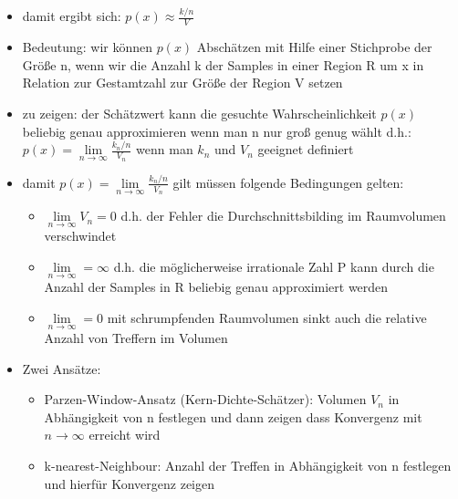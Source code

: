 \documentclass{article} %
\begin{document}
\begin{itemize}
		\item damit ergibt sich: $p(x) \approx \frac{k/n}{V}$
		\item Bedeutung: wir können $p(x)$ Abschätzen mit Hilfe einer Stichprobe der Größe n, wenn wir die Anzahl k der Samples in einer Region R um x in Relation zur Gestamtzahl zur Größe der Region V setzen
		\item zu zeigen: der Schätzwert kann die gesuchte Wahrscheinlichkeit $p(x)$ beliebig genau approximieren wenn man n nur groß genug wählt d.h.: $p(x) = \lim\limits_{n \rightarrow \infty} \frac{k_n/n}{V_n}$ wenn man $k_n$ und $V_n$ geeignet definiert
		\item damit $p(x) = \lim\limits_{n \rightarrow \infty} \frac{k_n/n}{V_n}$ gilt müssen folgende Bedingungen gelten:
		\begin{itemize}
			\item $\lim\limits_{n\rightarrow \infty} V_n  = 0$ d.h. der Fehler die Durchschnittsbilding im Raumvolumen verschwindet
			\item $\lim\limits_{n\rightarrow\infty} = \infty$ d.h. die möglicherweise irrationale Zahl P kann durch die Anzahl der Samples in R beliebig genau approximiert werden
			\item $\lim\limits_{n\rightarrow\infty} = 0$ mit schrumpfenden Raumvolumen sinkt auch die relative Anzahl von Treffern im Volumen
		\end{itemize}
		\item Zwei Ansätze:
		\begin{itemize}
			\item Parzen-Window-Ansatz (Kern-Dichte-Schätzer): Volumen $V_n$ in Abhängigkeit von n festlegen und dann zeigen dass Konvergenz mit $n\rightarrow\infty$ erreicht wird
			\item k-nearest-Neighbour: Anzahl der Treffen in Abhängigkeit von n festlegen und hierfür Konvergenz zeigen
		\end{itemize}
	\end{itemize}
\end{document}
